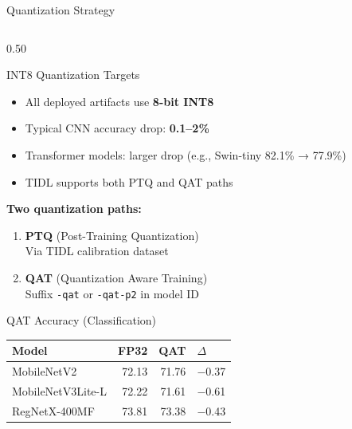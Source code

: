 \documentclass[aspectratio=169,12pt]{beamer}
\newcommand{\highlight}[1]{\textcolor{TIRed}{\textbf{#1}}}
\begin{document}
\begin{frame}{Quantization Strategy}
  \begin{columns}[T]
    \begin{column}{0.50\textwidth}
      \begin{block}{INT8 Quantization Targets}
        \begin{itemize}\footnotesize
          \item All deployed artifacts use \highlight{8-bit INT8}
          \item Typical CNN accuracy drop: \textbf{0.1–2\%}
          \item Transformer models: larger drop (e.g., Swin-tiny 82.1\% → 77.9\%)
          \item TIDL supports both PTQ and QAT paths
        \end{itemize}
      \end{block}

      \vspace{0.3cm}
      \textbf{Two quantization paths:}
      \begin{enumerate}\footnotesize
        \item \textbf{PTQ} (Post-Training Quantization)\\
              Via TIDL calibration dataset
        \item \textbf{QAT} (Quantization Aware Training)\\
              Suffix \texttt{-qat} or \texttt{-qat-p2} in model ID
      \end{enumerate}

      \vspace{0.3cm}
      \begin{alertblock}{QAT Accuracy (Classification)}
        \scriptsize
        \begin{tabular}{lrrl}
          \toprule
          Model & FP32 & QAT & $\Delta$ \\
          \midrule
          MobileNetV2 & 72.13 & 71.76 & $-$0.37 \\
          MobileNetV3Lite-L & 72.22 & 71.61 & $-$0.61 \\
          RegNetX-400MF & 73.81 & 73.38 & $-$0.43 \\
          \bottomrule
        \end{tabular}
      \end{alertblock}
    \end{column}


\end{columns}
\end{frame}
\end{document}
